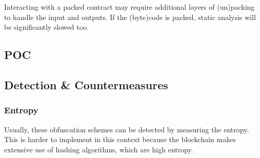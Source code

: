 Interacting with a packed contract may require additional layers of (un)packing to handle the input and outputs.
If the (byte)code is packed, static analysis will be significantly slowed too.

\subsection{POC}

\subsection{Detection \& Countermeasures}

\subsubsection{Entropy}

Usually, these obfuscation schemes can be detected by measuring the entropy.
This is harder to implement in this context because the blockchain makes extensive use of hashing algorithms, which are high entropy.
